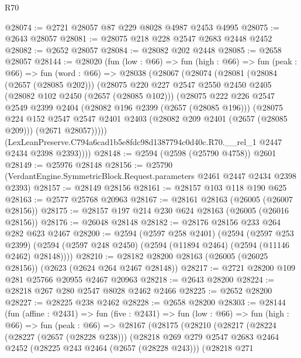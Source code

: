 \begin{lexlean}{R70}
\begin{coremodule}
@28074 := @2721 @28057 @87 @229 @8028 @4987 @2453 @4995
@28075 := @2643 @28057
@28081 := @28075 @218 @228 @2547 @2683 @2448 @2452
@28082 := @2652 @28057
@28084 := @28082 @202 @2448
@28085 := @2658 @28057
@28144 := @28020
    (fun (low : @66) =>
    fun (high : @66) =>
    fun (peak : @66) =>
    fun (word : @66) =>
    @28038
      (@28067
        (@28074
          (@28081
            (@28084 (@2657 (@28085 @202)))
            (@28075
              @220
              @227
              @2547
              @2550
              @2450
              @2405
              (@28082 @102 @2450 (@2657 (@28085 @102)))
              (@28075
                @222
                @226
                @2547
                @2549
                @2399
                @2404
                (@28082 @196 @2399 (@2657 (@28085 @196)))
                (@28075
                  @224
                  @152
                  @2547
                  @2547
                  @2401
                  @2403
                  (@28082 @209 @2401 (@2657 (@28085 @209)))
                  (@2671 @28057)))))
          (LexLeanPreserve.C794a6cad1b5e8fdc98d1387794c0d40c.R70.__rel_1 @2447 @2434 @2398 @2393))))
@28148 := @2594 (@2598 (@25790 @4758)) @2601
@28149 := @25976 @28148
@28156 := @25790 (VerdantEngine.SymmetricBlock.Request.parameters @2461 @2447 @2434 @2398 @2393)
@28157 := @28149 @28156
@28161 := @28157 @103 @118 @190 @625
@28163 := @2577 @25768 @20963
@28167 := @28161 @28163 (@26005 (@26007 @28156))
@28175 := @28157 @197 @214 @230 @624 @28163 (@26005 (@26016 @28156))
@28176 := @26048 @28148
@28182 := @28176 @28156 @233 @264 @282 @623 @2467
@28200 := @2594
    (@2597 @258 @2401)
    (@2594
      (@2597 @253 @2399)
      (@2594 (@2597 @248 @2450) (@2594 (@11894 @2464) (@2594 (@11146 @2462) @28148))))
@28210 := @28182 @28200 @28163 (@26005 (@26025 @28156)) (@2623 (@2624 @264 @2467 @28148))
@28217 := @2721 @28200 @109 @281 @25766 @20955 @2467 @20963
@28218 := @2643 @28200
@28224 := @28218 @267 @280 @2547 @8028 @2462 @2466
@28225 := @2652 @28200
@28227 := @28225 @238 @2462
@28228 := @2658 @28200
@28303 := @28144
    (fun (affine : @2431) =>
    fun (five : @2431) =>
    fun (low : @66) =>
    fun (high : @66) =>
    fun (peak : @66) =>
    @28167
      (@28175
        (@28210
          (@28217
            (@28224
              (@28227 (@2657 (@28228 @238)))
              (@28218
                @269
                @279
                @2547
                @2683
                @2464
                @2452
                (@28225 @243 @2464 (@2657 (@28228 @243)))
                (@28218
                  @271

\end{coremodule}
\end{lexlean}
